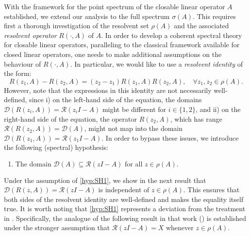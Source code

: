 \documentclass[english]{myarticle}
\begin{document}
\begin{sloppypar}
With the framework for the point spectrum of the closable linear operator $A$ established, we extend our analysis to the full spectrum $\sigma(A)$. This requires first a thorough investigation of the resolvent set $\rho(A)$ and the associated \emph{resolvent operator} $R(\cdot,A)$ of $A$. In order to develop a coherent spectral theory for closable linear operators, paralleling to the classical framework available for closed linear operators, one needs to make additional assumptions on the behaviour of $R(\cdot,A)$. In particular, we would like to use a \emph{resolvent identity} of the form:
\begin{equation*}
    R(z_1,A)-R(z_2,A) = (z_2-z_1)R(z_1,A)R(z_2,A), \quad \forall z_1,z_2 \in \rho(A).
\end{equation*}
However, note that the expressions in this identity are not necessarily well-defined, since i) on the left-hand side of the equation, the domains $\mathcal{D}(R(z_i, A)) = \mathcal{R}(z_iI - A)$ might be different for $i \in \{1,2\}$, and ii) on the right-hand side of the equation, the operator $R(z_2, A)$, which has range $\mathcal{R}(R(z_2, A)) = \mathcal{D}(A)$, might not map into the domain $\mathcal{D}(R(z_1, A)) = \mathcal{R}(z_1I - A)$. In order to bypass these issues, we introduce the following (spectral) hypothesis:
\begin{enumerate}[label=({SH}{{\arabic*}})]
    \item \label{hyp:SH1} The domain $\mathcal{D}(A) \subseteq \mathcal{R}(zI-A)$ for all $z \in \rho(A)$.
\end{enumerate}
Under the assumption of \ref{hyp:SH1}, we show in the next result that $\mathcal{D}(R(z,A)) = \mathcal{R}(zI - A)$ is independent of $z \in \rho(A)$. This ensures that both sides of the resolvent identity are well-defined and makes the equality itself true. It is worth noting that \ref{hyp:SH1} represents a deviation from the treatment in \cite[Section 5.1]{Taylor1986}. Specifically, the analogue of the following result in that work (\cite[Theorem 5.1.C]{Taylor1986}) is established under the stronger assumption that $\mathcal{R}(zI-A) = X$ whenever $z \in \rho(A)$.


\end{sloppypar}
\end{document}
